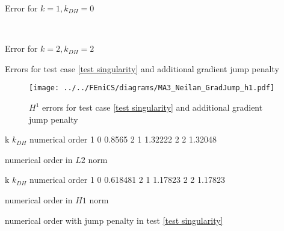 \begin{table}[h]
	\begin{subtable}[b]{0.45\textwidth}
		\centering
		\pgfplotstabletypeset[columns={iterations, l2error, h1error,N},
		every row 0 column 0/.style={set content=init},
		]{\MAThreeJumpdegOneZero}
		\caption{Error for $k=1, k_{DH}=0$}
	\end{subtable}
	~
	\begin{subtable}[b]{0.45\textwidth}
		\centering
		\pgfplotstabletypeset[
		columns={iterations, l2error, h1error,N},
		every row 0 column 0/.style={set content=init},
		]{\MAThreeJumpdegTwoTwo}
		\caption{Error for $k=2, k_{DH}=2$}
	\end{subtable}
	\caption{Errors for test case \ref{test singularity} and additional gradient jump penalty}
	\label{tab: l2 errors test 3 jump}
\end{table}	
\begin{figure}[H]
	\centering
	\texttt{[image: ../../FEniCS/diagrams/MA3\_Neilan\_GradJump\_h1.pdf]}
	\caption{$H^1$ errors for test case \ref{test singularity} and additional gradient jump penalty}
	\label{fig: h1 errors test 3 jump}
\end{figure}

\begin{table}[H]
\centering
\begin{subtable}[b]{0.45\textwidth}
	\pgfplotstabletypeset
	{
		k $k_{DH}$ {numerical order}
		1 0 0.8565
		2 1 1.32222
		2 2 1.32048
	}
	\caption{numerical order in $L2$ norm}
	\end{subtable}
	\begin{subtable}[b]{0.45\textwidth}
	\pgfplotstabletypeset
	{
		k $k_{DH}$ {numerical order}
		1 0 0.618481
		2 1 1.17823
		2 2 1.17823
	}
	\caption{numerical order in $H1$ norm}
	\end{subtable}
	\caption{numerical order with jump penalty in test \ref{test singularity}}
\label{tab: order jump 3}
\end{table}

